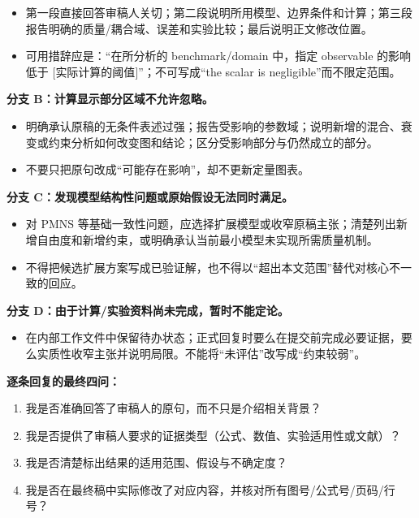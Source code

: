 \documentclass[
  chinese,
  UTF8]{ctexart}
\providecommand{\tightlist}{%
  \setlength{\itemsep}{0pt}\setlength{\parskip}{0pt}}
\begin{document}
\begin{itemize}
\tightlist
\item
  第一段直接回答审稿人关切；第二段说明所用模型、边界条件和计算；第三段报告明确的质量/耦合域、误差和实验比较；最后说明正文修改位置。
\item
  可用措辞应是：``在所分析的 benchmark/domain 中，指定 observable
  的影响低于 {[}实际计算的阈值{]}''；不可写成``the scalar is
  negligible''而不限定范围。
\end{itemize}

\textbf{分支 B：计算显示部分区域不允许忽略。}

\begin{itemize}
\tightlist
\item
  明确承认原稿的无条件表述过强；报告受影响的参数域；说明新增的混合、衰变或约束分析如何改变图和结论；区分受影响部分与仍然成立的部分。
\item
  不要只把原句改成``可能存在影响''，却不更新定量图表。
\end{itemize}

\textbf{分支 C：发现模型结构性问题或原始假设无法同时满足。}

\begin{itemize}
\tightlist
\item
  对 PMNS
  等基础一致性问题，应选择扩展模型或收窄原稿主张；清楚列出新增自由度和新增约束，或明确承认当前最小模型未实现所需质量机制。
\item
  不得把候选扩展方案写成已验证解，也不得以``超出本文范围''替代对核心不一致的回应。
\end{itemize}

\textbf{分支 D：由于计算/实验资料尚未完成，暂时不能定论。}

\begin{itemize}
\tightlist
\item
  在内部工作文件中保留待办状态；正式回复时要么在提交前完成必要证据，要么实质性收窄主张并说明局限。不能将``未评估''改写成``约束较弱''。
\end{itemize}

\textbf{逐条回复的最终四问：}

\begin{enumerate}
\def\labelenumi{\arabic{enumi}.}
\tightlist
\item
  我是否准确回答了审稿人的原句，而不只是介绍相关背景？
\item
  我是否提供了审稿人要求的证据类型（公式、数值、实验适用性或文献）？
\item
  我是否清楚标出结果的适用范围、假设与不确定度？
\item
  我是否在最终稿中实际修改了对应内容，并核对所有图号/公式号/页码/行号？
\end{enumerate}
\end{document}
